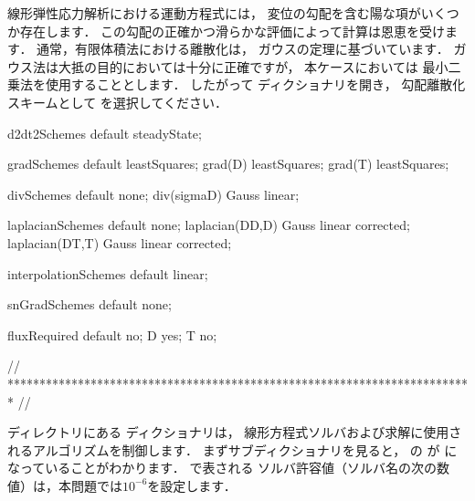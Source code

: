 線形弾性応力解析における運動方程式には，
変位の勾配を含む陽な項がいくつか存在します．
この勾配の正確かつ滑らかな評価によって計算は恩恵を受けます．
通常，有限体積法における離散化は，
%
ガウスの定理に基づいています．
ガウス法は大抵の目的においては十分に正確ですが，
本ケースにおいては
%
%
最小二乗法を使用することとします．
したがって
%
%
ディクショナリを開き，
勾配離散化スキームとして
%
%
を選択してください．
\begin{OFverbatim}[file, linenum=17]

d2dt2Schemes
{
    default         steadyState;
}

gradSchemes
{
    default         leastSquares;
    grad(D)         leastSquares;
    grad(T)         leastSquares;
}

divSchemes
{
    default         none;
    div(sigmaD)     Gauss linear;
}

laplacianSchemes
{
    default         none;
    laplacian(DD,D) Gauss linear corrected;
    laplacian(DT,T) Gauss linear corrected;
}

interpolationSchemes
{
    default         linear;
}

snGradSchemes
{
    default         none;
}

fluxRequired
{
    default         no;
    D               yes;
    T               no;
}


// ************************************************************************* //
\end{OFverbatim}
ディレクトリにある
ディクショナリは，
線形方程式ソルバおよび求解に使用されるアルゴリズムを制御します．
まずサブディクショナリを見ると，
の
%
%
が
%
%
になっていることがわかります．
%
%
で表される
ソルバ許容値（ソルバ名の次の数値）は，本問題では$10^{-6}$を設定します．

